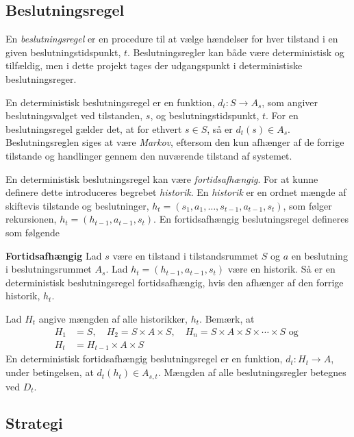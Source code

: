 \subsection{Beslutningsregel}
En \textit{beslutningsregel} er en procedure til at vælge hændelser for hver tilstand i en given beslutningstidspunkt, $t$. Beslutningsregler kan både være deterministisk og tilfældig, men i dette projekt tages der udgangspunkt i deterministiske beslutningsreger.

En deterministisk beslutningsregel er en funktion, $d_t:S\to A_s$, som angiver beslutningsvalget ved tilstanden, $s$, og beslutningstidspunkt, $t$. For en beslutningsregel gælder det, at for ethvert $s\in S$, så er $d_t(s)\in A_s$. Beslutningsreglen siges at være \textit{Markov}, eftersom den kun afhænger af de forrige tilstande og handlinger gennem den nuværende tilstand af systemet. 

En deterministisk beslutningsregel kan være \textit{fortidsafhængig}. For at kunne definere dette introduceres begrebet \textit{historik}. En \textit{historik} er en ordnet mængde af skiftevis tilstande og beslutninger, $h_t = (s_1,a_1, \dots, s_{t-1},a_{t-1}, s_t)$, som følger rekursionen, $h_t=(h_{t-1},a_{t-1},s_t)$. En fortidsafhængig beslutningsregel defineres som følgende

\begin{defn} \textbf{Fortidsafhængig}
\newline
Lad $s$ være en tilstand i tilstandsrummet $S$ og $a$ en beslutning i beslutningsrummet $A_s$. Lad  $h_t=(h_{t-1},a_{t-1},s_t)$ være en historik. Så er en deterministisk beslutningsregel fortidsafhængig, hvis den afhænger af den forrige historik, $h_t$.
\end{defn}

Lad $H_t$ angive mængden af alle historikker, $h_t$. Bemærk, at 
\begin{align*}
    H_1&=S, \quad H_2=S\times A\times S, \quad H_n =S\times A\times S\times \cdots \times S \text{ og }\\
    H_t&=H_{t-1}\times A\times S 
\end{align*}
En deterministisk fortidsafhængig beslutningsregel er en funktion, $d_t: H_t\to A$, under betingelsen, at $d_t(h_t)\in A_{s, t}$.
Mængden af alle beslutningsregler betegnes ved $D_t$. 

\subsection{Strategi}

